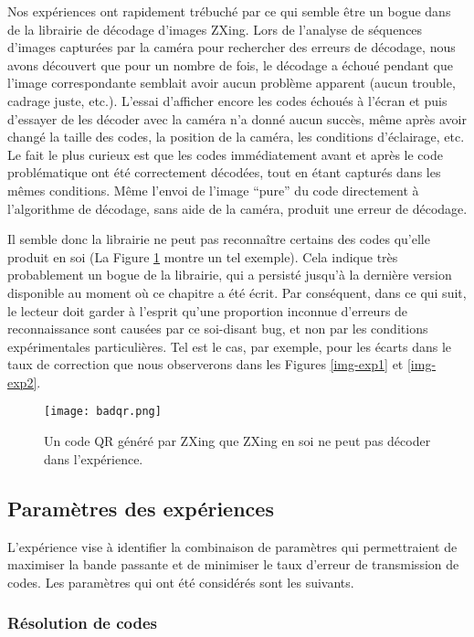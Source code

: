 Nos expériences ont rapidement trébuché par ce qui semble être un bogue dans de la librairie de décodage d'images ZXing. Lors de l'analyse de séquences d'images capturées par la caméra pour rechercher des erreurs de décodage, nous avons découvert que pour un nombre de fois, le décodage a échoué pendant que l'image correspondante semblait avoir aucun problème apparent (aucun trouble, cadrage juste, etc.). L'essai d'afficher encore les codes échoués à l'écran et puis d'essayer de les décoder avec la caméra n'a donné aucun succès, même après avoir changé la taille des codes, la position de la caméra, les conditions d'éclairage, etc. Le fait le plus curieux est que les codes immédiatement avant et après le code problématique ont été correctement décodées, tout en étant capturés dans les mêmes conditions. Même l'envoi de l'image ``pure''  du code directement à l'algorithme de décodage, sans aide de la caméra, produit une erreur de décodage.

Il semble donc la librairie ne peut pas reconnaître certains des codes qu'elle produit en soi (La Figure \ref{fig:qr:bad-code} montre un tel exemple). Cela indique très probablement un bogue de la librairie, qui a persisté jusqu'à la dernière version disponible au moment où ce chapitre a été écrit. Par conséquent, dans ce qui suit, le lecteur doit garder à l'esprit qu'une proportion inconnue d'erreurs de reconnaissance sont causées par ce soi-disant bug, et non par les conditions expérimentales particulières. Tel est le cas, par exemple, pour les écarts dans le taux de correction que nous observerons dans les Figures \ref{img-exp1} et \ref{img-exp2}.

\begin{figure}
\centering
\texttt{[image: badqr.png]}
\caption{Un code QR généré par ZXing que ZXing en soi ne peut pas décoder dans l'expérience.}
\label{fig:qr:bad-code}
\end{figure}

\subsection{Paramètres des expériences}

L'expérience vise à identifier la combinaison de paramètres qui permettraient de maximiser la bande passante et de minimiser le taux d'erreur de transmission de codes. Les paramètres qui ont été considérés sont les suivants.

\subsubsection{Résolution de codes}

